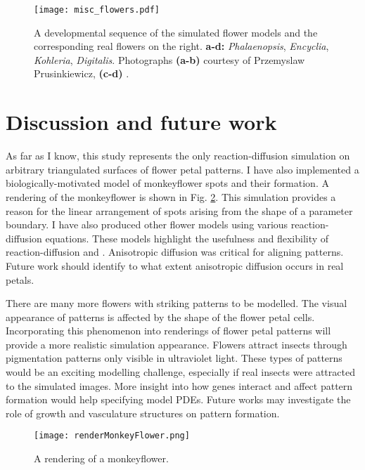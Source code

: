 \begin{figure}[ht]
	\centering
	\texttt{[image: misc\_flowers.pdf]}
	\caption[A developmental sequence of the simulated flower models and the corresponding real flowers]{A developmental sequence of the simulated flower models and the corresponding real flowers on the right. \textbf{a-d:} \textit{Phalaenopsis}, \textit{Encyclia}, \textit{Kohleria}, \textit{Digitalis}. Photographs \textbf{(a-b)} courtesy of Przemyslaw Prusinkiewicz, \textbf{(c-d)} .}
	\label{fig:miscFlowers}
\end{figure}

\section{Discussion and future work}
As far as I know, this study represents the only reaction-diffusion simulation on arbitrary triangulated surfaces of flower petal patterns. I have also implemented a biologically-motivated model of monkeyflower spots and their formation. A rendering of the monkeyflower is shown in Fig. \ref{fig:monkeyFlowerRendering}. This simulation provides a reason for the linear arrangement of spots arising from the shape of a parameter boundary. I have also produced other flower models using various reaction-diffusion equations. These models highlight the usefulness and flexibility of reaction-diffusion and \ProgramName{}. Anisotropic diffusion was critical for aligning patterns. Future work should identify to what extent anisotropic diffusion occurs in real petals.

There are many more flowers with striking patterns to be modelled. The visual appearance of patterns is affected by the shape of the flower petal cells. Incorporating this phenomenon into renderings of flower petal patterns will provide a more realistic simulation appearance. Flowers attract insects through pigmentation patterns only visible in ultraviolet light. These types of patterns would be an exciting modelling challenge, especially if real insects were attracted to the simulated images. More insight into how genes interact and affect pattern formation would help specifying model PDEs. Future works may investigate the role of growth and vasculature structures on pattern formation. 

\begin{figure}[ht]
	\centering
	\texttt{[image: renderMonkeyFlower.png]}
	\caption[A rendering of a monkeyflower]{A rendering of a monkeyflower.}
	\label{fig:monkeyFlowerRendering}
\end{figure}
